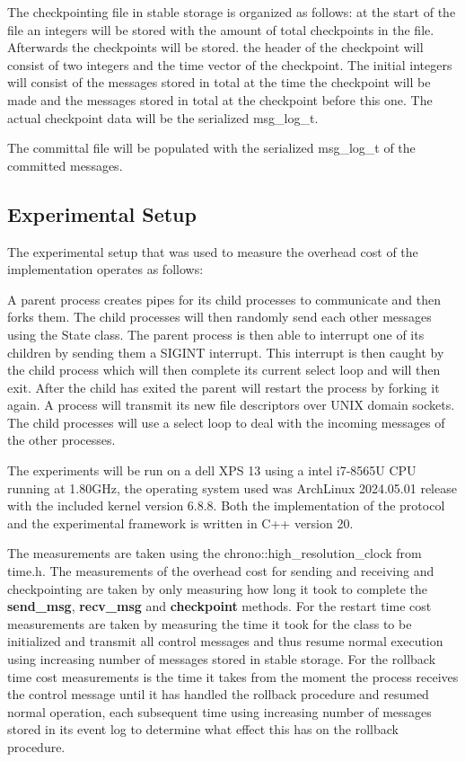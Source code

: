\documentclass[twocolumn, a4paper,11pt]{article}%
\begin{document}
\par The checkpointing file in stable storage is organized as follows: at the start of the file an integers will be stored with the amount of total checkpoints in the file. Afterwards the checkpoints will be stored. the header of the checkpoint will consist of two integers and the time vector of the checkpoint. The initial integers will consist of the messages stored in total at the time the checkpoint will be made and the messages stored in total at the checkpoint before this one. The actual checkpoint data will be the serialized msg\_log\_t. 
\par The committal file will be populated with the serialized msg\_log\_t of the committed messages.

\subsection{Experimental Setup}
The experimental setup that was used to measure the overhead cost of the implementation operates as follows:
\par A parent process  creates pipes for its child processes to communicate and then forks them. The child processes will then randomly send each other messages using the State class. The parent process is then able to interrupt one of its children by sending them a SIGINT interrupt. This interrupt is then caught by the child process which will then complete its current select loop and will then exit. After the child has exited the parent will restart the process by forking it again.  A process will transmit its new file descriptors over UNIX domain sockets.
The child processes will use a select loop to deal with the incoming messages of the other processes.
\par The experiments will be run on a dell XPS 13 using a intel i7-8565U CPU running at 1.80GHz, the operating system used was ArchLinux 2024.05.01 release with the included kernel version 6.8.8.  Both the implementation of the protocol and the experimental framework is written in C++ version 20. 
\par The measurements are taken using the chrono::high\_resolution\_clock from time.h.  The measurements of the overhead cost for sending and receiving and checkpointing are taken by only measuring how long it took to complete the \textbf{send\_msg}, \textbf{recv\_msg} and \textbf{checkpoint} methods. For the restart time cost measurements are taken by measuring the time it took for the class to be initialized and transmit all control messages and thus resume normal execution using increasing number of messages stored in stable storage. For the rollback time cost measurements is the time it takes from the moment the process receives the control message until it has handled the rollback procedure and resumed normal operation, each subsequent time using increasing number of messages stored in its event log to determine what effect this has on the rollback procedure.
\end{document}
